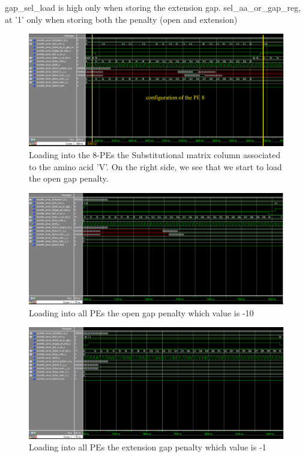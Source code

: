 gap\_sel\_load is high only when storing the extension gap.
sel\_aa\_or\_gap\_reg, at '1' only when storing both the penalty (open and extension)
\begin{figure}[h!]
	\centering
	\includegraphics[width=\textwidth]{imm/sw/load_pe_8.png}
	\caption{Loading into the 8-PEs the Substitutional matrix column associated to the amino acid 'V'. On the right side, we see that we start to load the open gap penalty.} 
	\label{tb_sw_pe8}
\end{figure}
\begin{figure}[h!]
	\centering
	\includegraphics[width=\textwidth]{imm/sw/open_gap_10.png}
	\caption{Loading into all PEs the open gap penalty which value is -10} 
	\label{tb_open_gap_10}
\end{figure}
\begin{figure}[h!]
	\centering
	\includegraphics[width=\textwidth]{imm/sw/ext_gap.png}
	\caption{Loading into all PEs the extension gap penalty which value is -1} 
	\label{tb_ext_gap}
\end{figure}